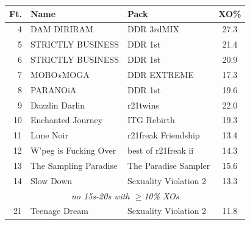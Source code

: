 \documentclass[10pt]{sigplanconf}
\begin{document}
\begin{figure}[t]
	\begin{center}
		\small
	\begin{tabular}{r|l|l|c}
		\bf Ft. & \bf Name & \bf Pack & \bf XO\% \\
		\hline
		 4 & DAM DIRIRAM              & DDR 3rdMIX            & 27.3 \\
		 5 & STRICTLY BUSINESS        & DDR 1st               & 21.4 \\
		 6 & STRICTLY BUSINESS        & DDR 1st               & 20.9 \\
		 7 & MOBO$\star$MOGA          & DDR EXTREME           & 17.3 \\
		 8 & PARANOiA                 & DDR 1st               & 19.6 \\
		 9 & Dazzlin Darlin           & r21twins              & 22.0 \\
		10 & Enchanted Journey        & ITG Rebirth           & 19.3 \\
		11 & Lune Noir                & r21freak Friendship   & 13.4 \\
		12 & W'peg is Fucking Over    & best of r21freak ii   & 14.3 \\
		13 & The Sampling Paradise    & The Paradise Sampler  & 15.6 \\
		14 & Slow Down                & Sexuality Violation 2 & 13.3 \\
		\multicolumn{4}{c}{\em no 15s-20s with $\ge$10\% XOs} \\
		21 & Teenage Dream            & Sexuality Violation 2 & 11.8 \\

\end{tabular}
\end{center}
\end{figure}
\end{document}
